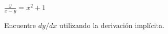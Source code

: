 \item $\displaystyle \frac{y}{x - y} = x^2 + 1$
\par
Encuentre $dy/dx$ utilizando la derivación implícita.

